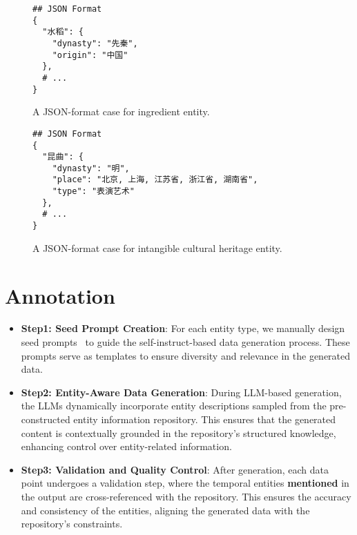 \begin{figure}[H]
\centering
\begin{adjustbox}{width=0.33\textwidth}
\begin{tcolorbox}[title={\textbf{\small Ingredient}}, colback=whitesmoke, colframe=gray, boxrule=2pt, arc=0mm]
{\small
\begin{verbatim}
## JSON Format
{
  "水稻": {
    "dynasty": "先秦",
    "origin": "中国"
  },
  # ...
}
\end{verbatim}
}
\end{tcolorbox}
\end{adjustbox}
\caption{A JSON-format case for ingredient entity.}
\label{fig:ingredient_case}
\end{figure}



\begin{figure}[H]
\centering
\begin{adjustbox}{width=0.33\textwidth}
\begin{tcolorbox}[title={\textbf{\small Intangible Cultural Heritage}}, colback=whitesmoke, colframe=gray, boxrule=2pt, arc=0mm]
{\small
\begin{verbatim}
## JSON Format
{
  "昆曲": {
    "dynasty": "明",
    "place": "北京, 上海, 江苏省, 浙江省, 湖南省",
    "type": "表演艺术"
  },
  # ...
}
\end{verbatim}
}
\end{tcolorbox}
\end{adjustbox}
\caption{A JSON-format case for intangible cultural heritage entity.}
\label{fig:ih_case}
\end{figure}



\section{Annotation}
\label{app:anno}
\begin{itemize}
    \item \textbf{Step1: Seed Prompt Creation}: For each entity type, we manually design seed prompts~\citep{alpaca} to guide the self-instruct-based data generation process. 
    These prompts serve as templates to ensure diversity and relevance in the generated data.
    \item \textbf{Step2: Entity-Aware Data Generation}:  During LLM-based generation, the LLMs dynamically incorporate entity descriptions sampled from the pre-constructed entity information repository. This ensures that the generated content is contextually grounded in the repository's structured knowledge, enhancing control over entity-related information.
    \item \textbf{Step3: Validation and Quality Control}: After generation, each data point undergoes a validation step, where the temporal entities \textbf{mentioned} in the output are cross-referenced with the repository. 
    This ensures the accuracy and consistency of the entities, aligning the generated data with the repository's constraints.
\end{itemize}


